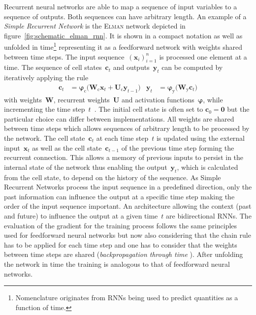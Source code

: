 Recurrent neural networks are able to map a sequence of input variables to a
sequence of outputs. Both sequences can have arbitrary length. An example of a
\emph{Simple Recurrent Network} is the \textsc{Elman} network \cite{elman}
depicted in figure~\ref{fig:schematic_elman_rnn}. It is shown in a compact
notation as well as unfolded in time\footnote{Nomenclature originates from RNNs
  being used to predict quantities as a function of time.} representing it as a
feedforward network with weights shared between time steps.
The input sequence~$\left( \mathbf{x}_i \right)_{i=1}^n$ is processed one
element at a time. The sequence of cell states~$\mathbf{c}_t$ and
outputs~$\mathbf{y}_t$ can be computed by iteratively applying the rule
\begin{align*}
  \mathbf{c}_t &= \bm{\varphi}_{\text{c}}\Big( \mathbf{W}_{\text{c}} \mathbf{x}_{t} + \mathbf{U}_{\text{c}} \mathbf{y}_{t-1} \Big)
  &\mathbf{y}_t &= \bm{\varphi}_{\text{y}}\Big( \mathbf{W}_{\text{y}} \mathbf{c}_{t} \Big)
\end{align*}
with weights~$\mathbf{W}$, recurrent weights~$\mathbf{U}$ and activation
functions~$\bm{\varphi}$, while incrementing the time step~$t$~\cite{elman,
  graves}. The initial cell state is often set to $\mathbf{c}_0 = \mathbf{0}$
but the particular choice can differ between implementations. All weights are
shared between time steps which allows sequences of arbitrary length to be
processed by the network. The cell state~$\mathbf{c}_t$ at each time step~$t$ is
updated using the external input~$\mathbf{x}_t$ as well as the cell
state~$\mathbf{c}_{t-1}$ of the previous time step forming the recurrent
connection. This allows a memory of previous inputs to persist in the internal
state of the network thus enabling the output~$\mathbf{y}_t$, which is
calculated from the cell state, to depend on the history of the sequence. As
Simple Recurrent Networks process the input sequence in a predefined direction,
only the past information can influence the output at a specific time step
making the order of the input sequence important. An architecture allowing the
context (past and future) to influence the output at a given time~$t$ are
bidirectional RNNs. The evaluation of the gradient for the training process
follows the same principles used for feedforward neural networks but now also
considering that the chain rule has to be applied for each time step and one has
to consider that the weights between time steps are shared
(\emph{backpropagation through time} \cite{williams_zipser}). After unfolding
the network in time the training is analogous to that of feedforward neural
networks.

